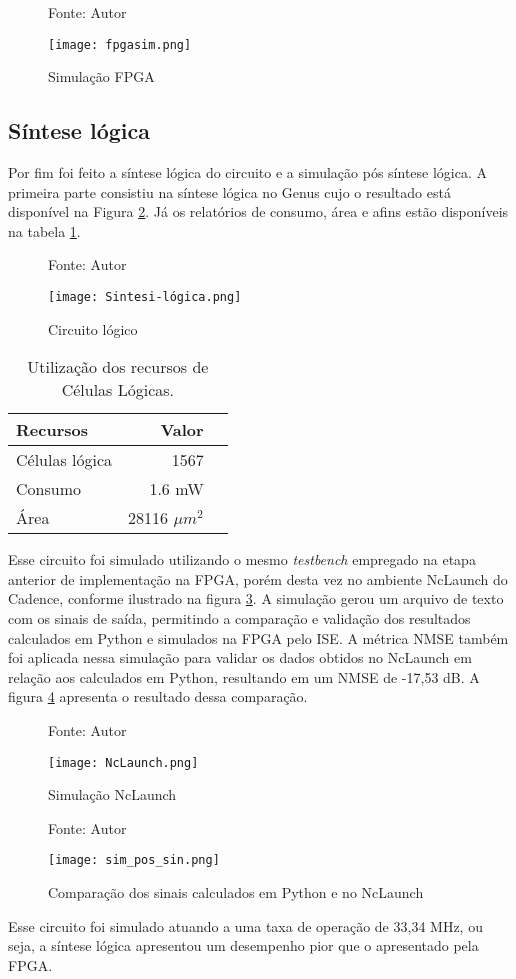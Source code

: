 \begin{figure}[htbp!]
	\centering
	\captionsetup{justification=centering}
	\caption*{Fonte: Autor}
	\texttt{[image: fpgasim.png]}
	\caption{Simulação FPGA}
	\label{fig:simfpga}
\end{figure}


\subsection{Síntese lógica}
Por fim foi feito a síntese lógica do circuito e a simulação pós síntese lógica. A primeira parte consistiu na síntese lógica no Genus cujo o resultado está disponível na Figura \ref{fig:circuito_logico}. Já os relatórios de consumo, área e afins estão disponíveis na tabela \ref{tab:recursos_sintese}. 

\begin{figure}[htbp!]
	\centering
	\captionsetup{justification=centering}
	\caption*{Fonte: Autor}
	\texttt{[image: Sintesi-lógica.png]}
	\caption{Circuito lógico}
	\label{fig:circuito_logico}
\end{figure}

\begin{table}[htbp!]
	\centering
	\begin{tabular}{|l|r|r|}
		\hline
		Recursos & Valor  \\
		\hline
		Células lógica & 1567  \\
		Consumo & 1.6 mW  \\
		Área & 28116 $ \mu m^2$  \\
		\hline
	\end{tabular}
	\caption{Utilização dos recursos de Células Lógicas.}
	\label{tab:recursos_sintese}
\end{table}

Esse circuito foi simulado utilizando o mesmo \textit{testbench} empregado na etapa anterior de implementação na FPGA, porém desta vez no ambiente NcLaunch do Cadence, conforme ilustrado na figura \ref{fig:NcLaunch}. A simulação gerou um arquivo de texto com os sinais de saída, permitindo a comparação e validação dos resultados calculados em Python e simulados na FPGA pelo ISE. A métrica NMSE também foi aplicada nessa simulação para validar os dados obtidos no NcLaunch em relação aos calculados em Python, resultando em um NMSE de -17,53 dB. A figura \ref{fig:simpost} apresenta o resultado dessa comparação.


\begin{figure}[htbp!]
	\centering
	\captionsetup{justification=centering}
	\caption*{Fonte: Autor}
	\texttt{[image: NcLaunch.png]}
	\caption{Simulação NcLaunch}
	\label{fig:NcLaunch}
\end{figure}


\begin{figure}[htbp!]
	\centering
	\captionsetup{justification=centering}
	\caption*{Fonte: Autor}
	\texttt{[image: sim\_pos\_sin.png]}
	\caption{Comparação dos sinais calculados em Python e no NcLaunch} 
	\label{fig:simpost}
\end{figure}

Esse circuito foi simulado atuando a uma taxa de operação de 33,34 MHz, ou seja, a síntese lógica apresentou um desempenho pior que o apresentado pela FPGA. 